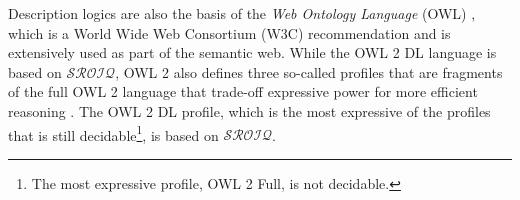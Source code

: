 
Description logics are also the basis of the \emph{Web Ontology Language} (OWL) \cite{hitzler2009owl_primer,motik2009owl_spec}, which is a World Wide Web Consortium (W3C) recommendation and is extensively used as part of the semantic web. While the OWL 2 DL language is based on $\mathcal{SROIQ}$, OWL 2 also defines three so-called profiles that are fragments of the full OWL 2 language that trade-off expressive power for more efficient reasoning \cite{motik2009owl_profiles,motik2009owl_spec}. The OWL 2 DL profile, which is the most expressive of the profiles that is still decidable\footnote{The most expressive profile, OWL 2 Full, is not decidable.}, is based on $\mathcal{SROIQ}$.


